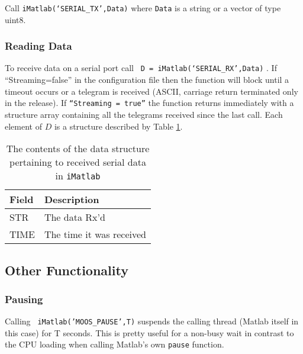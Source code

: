\documentclass[a4paper,10pt]{article}
\newcommand{\Code}[1]{\texttt{#1} }
\newcommand{\code}[1]{\Code{#1} }
\begin{document}
Call \code{iMatlab(`SERIAL\_TX',Data)} where \code{Data} is a
string or a vector of type uint8.

\subsubsection{Reading Data}

To receive data on a serial port call \code{ D =
iMatlab(`SERIAL\_RX',Data)}. If ``Streaming=false'' in the
configuration file then the function will block until a timeout
occurs or a telegram is received (ASCII, carriage return
terminated only in the release). If  \code{``Streaming  = true''}
the function returns immediately with a structure array containing
all the telegrams received since the last call. Each element of
$D$ is a structure described by Table \ref{Tab:iMatlabSerial}.


\begin{table}[ht]
\centering
\begin{tabularx}{\linewidth}{p{2.5in}|X}
\textbf{Field} &  \textbf{Description}\\\hline
            STR   & The data Rx'd\\
            TIME  & The time it was received\\
\hline
\end{tabularx}
\caption{The contents of the data
structure pertaining to received serial data in \code{iMatlab}}
\normalsize
\label{Tab:iMatlabSerial} 
\end{table}



\subsection{Other Functionality}

\subsubsection{Pausing}
Calling \code{ iMatlab('MOOS\_PAUSE',T)}  suspends the calling
thread (Matlab itself in this case) for T seconds. This is pretty
useful for a non-busy wait in contrast to the CPU loading when
calling Matlab's own \code{pause} function.
\end{document}
